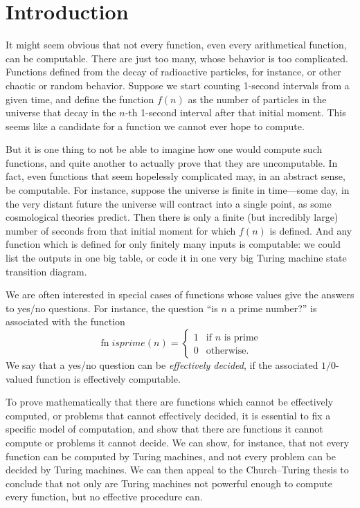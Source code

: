 \documentclass[10pt,a4paper]{article}
\theoremstyle{plain}
\theoremstyle{definition}
\theoremstyle{remark}
\newcommand*{\olfileid}[3]{}
\newcommand*{\olsection}[1]{\section*{#1}}
\providecommand{\fn}{\operatorname{fn}}
\providecommand{\fn}{\operatorname{fn}}
\begin{document}



\olfileid{tur}{und}{int} 
\olsection{Introduction}

It might seem obvious that not every function, even every arithmetical
function, can be computable. There are just too many, whose behavior
is too complicated.  Functions defined from the decay of radioactive
particles, for instance, or other chaotic or random behavior. Suppose
we start counting 1-second intervals from a given time, and define the
function $f(n)$ as the number of particles in the universe that decay
in the $n$-th 1-second interval after that initial moment.  This seems
like a candidate for a function we cannot ever hope to compute.

But it is one thing to not be able to imagine how one would compute
such functions, and quite another to actually prove that they are
uncomputable.  In fact, even functions that seem hopelessly
complicated may, in an abstract sense, be computable.  For instance,
suppose the universe is finite in time---some day, in the very distant
future the universe will contract into a single point, as some
cosmological theories predict. Then there is only a finite (but
incredibly large) number of seconds from that initial moment for which
$f(n)$ is defined.  And any function which is defined for only finitely
many inputs is computable: we could list the outputs in one big table,
or code it in one very big Turing machine state transition diagram.

We are often interested in special cases of functions whose values give
the answers to yes/no questions.  For instance, the question ``is $n$
a prime number?'' is associated with the function
\[
\fn{isprime}(n) = \begin{cases}
  1 & \text{if $n$ is prime}\\
  0 & \text{otherwise.}
  \end{cases}
\]
We say that a yes/no question can be \emph{effectively decided}, if
the associated $1/0$-valued function is effectively computable.

To prove mathematically that there are functions which cannot be
effectively computed, or problems that cannot effectively decided, it
is essential to fix a specific model of computation, and show
that there are functions it cannot compute or problems it cannot
decide.  We can show, for instance, that not every function can be
computed by Turing machines, and not every problem can be decided by
Turing machines.  We can then appeal to the Church--Turing thesis to
conclude that not only are Turing machines not powerful enough to
compute every function, but no effective procedure can.
\end{document}
